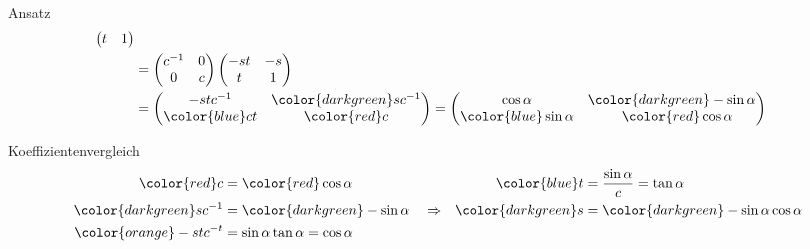 \begin{frame}[t]
\begin{columns}[t,onlytextwidth]
\begin{column}{0.58\textwidth}
\begin{block}{Ansatz}
\begin{align*}
\begin{pmatrix}
t&1
\end{pmatrix}
\\
&=
\begin{pmatrix}
c^{-1}&0\\
  0   &c
\end{pmatrix}
\begin{pmatrix}
-st&-s\\
  t& 1
\end{pmatrix}
\\
&=
\begin{pmatrix}
-stc^{-1}&{\color{darkgreen}sc^{-1}}\\
{\color{blue}ct}&{\color{red}c}
\end{pmatrix}
=
\begin{pmatrix}
\cos\alpha & {\color{darkgreen}- \sin\alpha} \\
{\color{blue}\sin\alpha} & \phantom{-}  {\color{red}\cos\alpha}
\end{pmatrix}
\end{align*}
\end{block}
\vspace{-10pt}
\begin{block}{Koeffizientenvergleich}
\vspace{-15pt}
\begin{align*}
{\color{red} c}
&=
{\color{red}\cos\alpha }
&&
&
{\color{blue}
t}&=\rlap{$\displaystyle\frac{\sin\alpha}{c} = \tan\alpha$} \\
{\color{darkgreen}sc^{-1}}&={\color{darkgreen}-\sin\alpha}
&
&\Rightarrow&
{\color{darkgreen}s}&={\color{darkgreen}-\sin\alpha}\cos\alpha
\\
{\color{orange} -stc^{-t}}
&=
\rlap{$\sin\alpha\tan\alpha = \cos\alpha \quad $}
\end{align*}
\end{block}
\end{column}
\end{columns}
\end{frame}
\egroup
